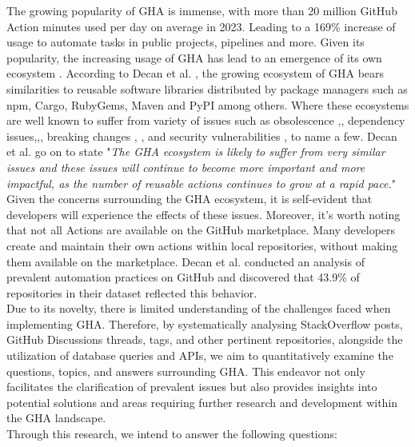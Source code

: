 \documentclass[conference]{IEEEtran}
\begin{document}
    The growing popularity of GHA is immense, with more than 20 million GitHub Action minutes used per day on average in 2023. Leading to a 169\% increase of usage to automate tasks in public projects,  pipelines and more\cite{b3}. Given its popularity,  the increasing usage of GHA has lead to an emergence of its own ecosystem \cite{b4}.  According to Decan et al. \cite{b4}, the growing ecosystem of GHA bears similarities to reusable software libraries distributed by package managers such as npm, Cargo, RubyGems, Maven and PyPI among others. Where these ecosystems are well known to suffer from variety of issues such as obsolescence \cite{b5},\cite{b6}, dependency issues\cite{b7},\cite{b8},\cite{b9}, breaking changes \cite{b10}, \cite{b11}, and security vulnerabilities \cite{b12}, \cite{b13} to name a few. Decan et al. \cite{b4} go on to state "\textit{The GHA ecosystem is likely to suffer from very similar issues and these issues will continue to become more important and more impactful, as the number of reusable actions continues to grow at a rapid pace.}"\\

    Given the concerns surrounding the GHA ecosystem, it is self-evident that developers will experience the effects of these issues.  Moreover, it's worth noting that not all Actions are available on the GitHub marketplace. Many developers create and maintain their own actions within local repositories, without making them available on the marketplace. Decan et al. \cite{b4} conducted an analysis of prevalent automation practices on GitHub and discovered that 43.9\% of repositories in their dataset reflected this behavior.\\

    Due to its novelty, there is limited understanding of the challenges faced when implementing GHA.  
Therefore,  by systematically analysing StackOverflow posts, GitHub Discussions threads, tags, and other pertinent repositories, alongside the utilization of database queries and APIs, we aim to quantitatively examine the questions, topics, and answers surrounding GHA. This endeavor not only facilitates the clarification of prevalent issues but also provides insights into potential solutions and areas requiring further research and development within the GHA landscape.\\

Through this research, we intend to answer the following questions:
\\
\end{document}

